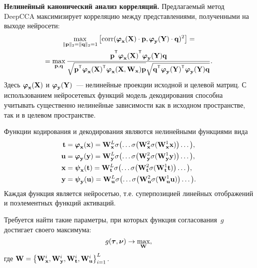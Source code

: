 \documentclass[11pt, a5paper]{dissert}
\begin{document}
\vspace{0.5cm}
\textbf{Нелинейный канонический анализ корреляций.}
Предлагаемый метод DeepCCA максимизирует корреляцию между представлениями, полученными на выходе нейросети:
\begin{multline}
	\max_{\|\bp\|_{2}=\|\bq\|_{2}=1}\left[ \text{corr}(\bphi_{\bx}(\bX) \cdot \bp, \bphi_{\by}(\bY) \cdot \bq)^{2}\right] = \\ = \max_{\bp, \bq} \frac{\bp^{\T} \bphi_{\bx}(\bX)^{\T} \bphi_{\by}(\bY) \bq}{\sqrt{\bp^{\T} \bphi_{\bx}(\bX)^{\T}  \bphi_{\bx}(\bX, \bW_{\bx}) \bp} \sqrt{\bq^{\T} \bphi_{\by}(\bY)^{\T}  \bphi_{\by}(\bY) \bq}}.
	\label{ch1:eq:depp_cca_max_corr}
\end{multline}
Здесь $\boldsymbol{\varphi}_{\mathbf{x}}(\mathbf{X})$ и $\boldsymbol{\varphi}_{\mathbf{y}}(\mathbf{Y})$~--- нелинейные проекции исходной и целевой матриц.
С использованием нейросетевых функций модель декодирования способна учитывать существенно нелинейные зависимости как в исходном пространстве, так и в целевом пространстве.

Функции кодирования и декодирования являются нелинейными функциями вида
\begin{align*}
	\mathbf{t} &= \boldsymbol{\varphi}_{\mathbf{x}}(\mathbf{x}) =  \mathbf{W}_{\mathbf{x}}^L \sigma \bigl(\dots \sigma \bigl(\mathbf{W}_{\mathbf{x}}^2 \sigma(\mathbf{W}_{\mathbf{x}}^1 \mathbf{x}) \bigr) \dots \bigr), \\
	\mathbf{u} &= \boldsymbol{\varphi}_{\mathbf{y}}(\mathbf{y}) =  \mathbf{W}_{\mathbf{y}}^L \sigma \bigl(\dots \sigma \bigl(\mathbf{W}_{\mathbf{y}}^2 \sigma(\mathbf{W}_{\mathbf{y}}^1 \mathbf{y}) \bigr) \dots \bigr), \\
	\mathbf{x} &= \boldsymbol{\psi}_{\mathbf{x}}(\mathbf{t}) =  \mathbf{W}_{\mathbf{t}}^L \sigma \bigl(\dots \sigma \bigl(\mathbf{W}_{\mathbf{t}}^2 \sigma(\mathbf{W}_{\mathbf{t}}^1 \mathbf{t} ) \bigr) \dots \bigr), \\
	\mathbf{y} &= \boldsymbol{\psi}_{\mathbf{y}}(\mathbf{u}) =  \mathbf{W}_{\mathbf{u}}^L \sigma \bigl(\dots \sigma \bigl(\mathbf{W}_{\mathbf{u}}^2 \sigma(\mathbf{W}_{\mathbf{u}}^1 \mathbf{u} ) \bigr) \dots \bigr).
\end{align*}
Каждая функция является нейросетью, т.е. суперпозицией линейных отображений и поэлементных функций активаций.

Требуется найти такие параметры, при которых функция согласования~$g$ достигает своего максимума:
\begin{equation}
	g(\boldsymbol{\tau}, \boldsymbol{\nu}) \rightarrow \max_{\mathbf{W}},
	\label{ch2:eq:concordance}
\end{equation}
где $\mathbf{W} = \bigl\{\mathbf{W}_{\mathbf{x}}^i, \mathbf{W}_{\mathbf{y}}^i, \mathbf{W}_{\mathbf{t}}^i, \mathbf{W}_{\mathbf{u}}^i\bigr\}_{i=1}^L$.
\end{document}
